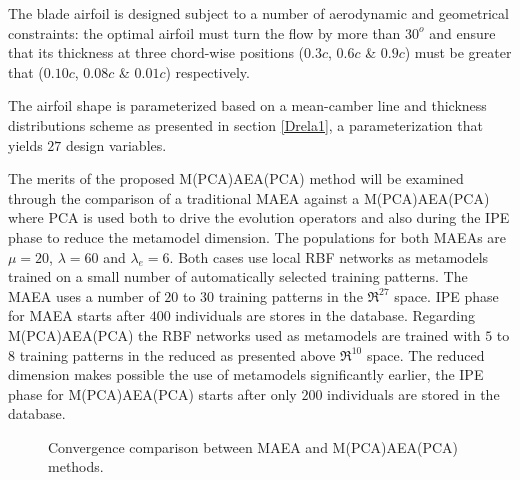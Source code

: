 The blade airfoil is designed subject to a number of aerodynamic and geometrical constraints: the optimal airfoil must turn the flow by more than $30^o$ and ensure that its thickness at three chord-wise positions ($0.3c$, $0.6c$ \& $0.9c$) must be greater that ($0.10c$, $0.08c$ \& $0.01c$)  respectively.     

The airfoil shape is parameterized based on a mean-camber line and thickness distributions scheme as presented in section \ref{Drela1}, a parameterization that yields $27$ design variables.

The merits of the proposed M(PCA)AEA(PCA) method will be examined through the comparison of a traditional MAEA against a M(PCA)AEA(PCA) where PCA is used both to drive the evolution operators and also during the IPE phase to reduce the metamodel dimension. The populations for both MAEAs are $\mu=20$, $\lambda=60$ and $\lambda_e=6$. Both cases use local RBF networks as metamodels trained on a small number of automatically selected training patterns. The MAEA uses a number of  $20$ to $30$ training patterns in the $\Re^{27}$ space. IPE phase for MAEA starts after $400$ individuals are stores in the database. Regarding M(PCA)AEA(PCA) the RBF networks used as metamodels are trained with $5$ to $8$ training patterns in the reduced as presented above $\Re^{10}$ space. The reduced dimension makes possible the use of metamodels significantly earlier, the IPE phase for M(PCA)AEA(PCA) starts after only $200$ individuals are stored in the database. 


\begin{figure}[h!]
\begin{minipage}[b]{1\linewidth}
 \centering
\end{minipage}
\caption{Convergence comparison between MAEA and M(PCA)AEA(PCA) methods.} 
\label{PCADrelaRes}
\end{figure}

